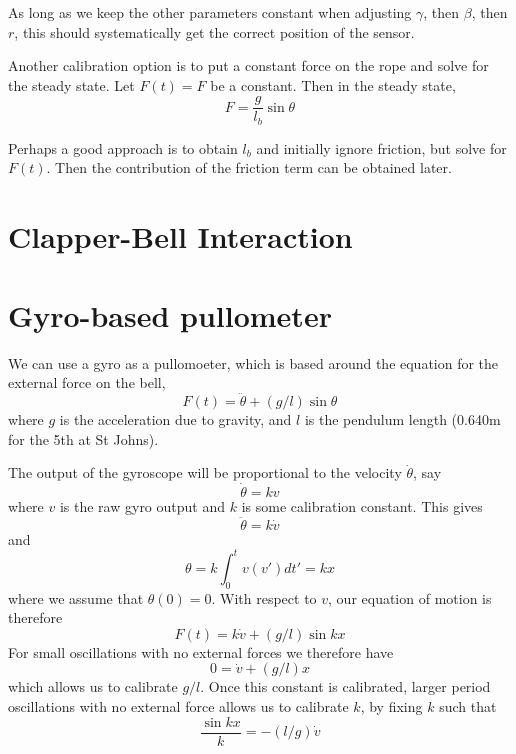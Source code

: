 \documentclass{article}
\begin{document}
As long as we keep the other parameters constant when adjusting $\gamma$, then $\beta$, then $r$, this should
systematically get the correct position of the sensor.



Another calibration option is to put a constant force on the rope and solve for the steady state.
Let $F(t) = F$ be a constant. Then in the steady state,
\begin{equation}
F = \frac{g}{l_b} \sin \theta
\end{equation}

Perhaps a good approach is to obtain $l_b$ and initially ignore friction, but solve for $F(t)$. Then
the contribution of the friction term can be obtained later.

\section{Clapper-Bell Interaction}

\section{Gyro-based pullometer}

We can use a gyro as a pullomoeter, which is based around the equation for the external force on the bell,
\begin{equation}
 F(t) = \ddot{\theta} + (g/l) \sin \theta
\end{equation}
where $g$ is the acceleration due to gravity, and $l$ is the pendulum length 
(0.640m for the 5th at St Johns).

The output of the gyroscope will be proportional to the velocity $\dot{\theta}$, say
\begin{equation}
\dot{\theta} = k v
\end{equation}
where $v$ is the raw gyro output and $k$ is some calibration constant.
This gives
\begin{equation}
\ddot{\theta} = k \dot{v}
\end{equation}
and
\begin{equation}
\theta = k \int_{0}^t v(v') dt' = kx
\end{equation}
where we assume that $\theta(0) = 0$. With respect to $v$, our equation of motion is therefore
\begin{equation}
F(t) = k \dot{v} + (g/l) \sin kx
\end{equation}
For small oscillations with no external forces we therefore have
\begin{equation}
0 = \dot{v} + (g/l) x
\end{equation}
which allows us to calibrate $g/l$. Once this constant is calibrated, larger period oscillations
with no external force allows us to calibrate $k$, by fixing $k$ such that
\begin{equation}
\frac{\sin kx}{k} = -(l/g) \dot{v}
\end{equation}
\end{document}

